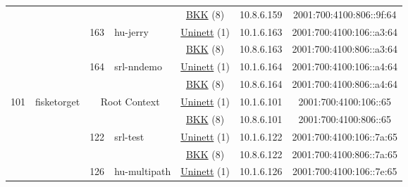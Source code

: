 \begin{small}
\begin{center}
\begin{longtable}{|c|c|c|c|c|c|c|c|}
  &  &  &  & \multicolumn{2}{|c|}{\tiny{\href{http://bkk.no}{BKK} (8)}} & \tiny{10.8.6.159} & \tiny{2001:700:4100:806::9f:64} \\* \cline{3-3}\cline{4-4}\cline{5-5}\cline{6-6}\cline{7-7}\cline{8-8}
  &  & \multirow{2}{*}{\tiny{163}} & \multicolumn{1}{|l|}{\multirow{2}{*}{\tiny{hu-jerry}}} & \multicolumn{2}{|c|}{\tiny{\href{https://www.uninett.no}{Uninett} (1)}} & \tiny{10.1.6.163} & \tiny{2001:700:4100:106::a3:64} \\* \cline{5-5}\cline{6-6}\cline{7-7}\cline{8-8}
  &  &  &  & \multicolumn{2}{|c|}{\tiny{\href{http://bkk.no}{BKK} (8)}} & \tiny{10.8.6.163} & \tiny{2001:700:4100:806::a3:64} \\* \cline{3-3}\cline{4-4}\cline{5-5}\cline{6-6}\cline{7-7}\cline{8-8}
  &  & \multirow{2}{*}{\tiny{164}} & \multicolumn{1}{|l|}{\multirow{2}{*}{\tiny{srl-nndemo}}} & \multicolumn{2}{|c|}{\tiny{\href{https://www.uninett.no}{Uninett} (1)}} & \tiny{10.1.6.164} & \tiny{2001:700:4100:106::a4:64} \\* \cline{5-5}\cline{6-6}\cline{7-7}\cline{8-8}
  &  &  &  & \multicolumn{2}{|c|}{\tiny{\href{http://bkk.no}{BKK} (8)}} & \tiny{10.8.6.164} & \tiny{2001:700:4100:806::a4:64} \\ \hline
 \multirow{14}{*}{\tiny{101}} & \multicolumn{1}{|l|}{\multirow{14}{*}{\tiny{fisketorget}}} & \multicolumn{2}{|c|}{\multirow{2}{*}{\tiny{Root Context}}} & \multicolumn{2}{|c|}{\tiny{\href{https://www.uninett.no}{Uninett} (1)}} & \tiny{10.1.6.101} & \tiny{2001:700:4100:106::65} \\* \cline{5-5}\cline{6-6}\cline{7-7}\cline{8-8}
  &  & \multicolumn{2}{|c|}{} & \multicolumn{2}{|c|}{\tiny{\href{http://bkk.no}{BKK} (8)}} & \tiny{10.8.6.101} & \tiny{2001:700:4100:806::65} \\* \cline{3-3}\cline{4-4}\cline{5-5}\cline{6-6}\cline{7-7}\cline{8-8}
  &  & \multirow{2}{*}{\tiny{122}} & \multicolumn{1}{|l|}{\multirow{2}{*}{\tiny{srl-test}}} & \multicolumn{2}{|c|}{\tiny{\href{https://www.uninett.no}{Uninett} (1)}} & \tiny{10.1.6.122} & \tiny{2001:700:4100:106::7a:65} \\* \cline{5-5}\cline{6-6}\cline{7-7}\cline{8-8}
  &  &  &  & \multicolumn{2}{|c|}{\tiny{\href{http://bkk.no}{BKK} (8)}} & \tiny{10.8.6.122} & \tiny{2001:700:4100:806::7a:65} \\* \cline{3-3}\cline{4-4}\cline{5-5}\cline{6-6}\cline{7-7}\cline{8-8}
  &  & \multirow{2}{*}{\tiny{126}} & \multicolumn{1}{|l|}{\multirow{2}{*}{\tiny{hu-multipath}}} & \multicolumn{2}{|c|}{\tiny{\href{https://www.uninett.no}{Uninett} (1)}} & \tiny{10.1.6.126} & \tiny{2001:700:4100:106::7e:65} \\* \cline{5-5}\cline{6-6}\cline{7-7}\cline{8-8}

\end{longtable}
\end{center}
\end{small}
